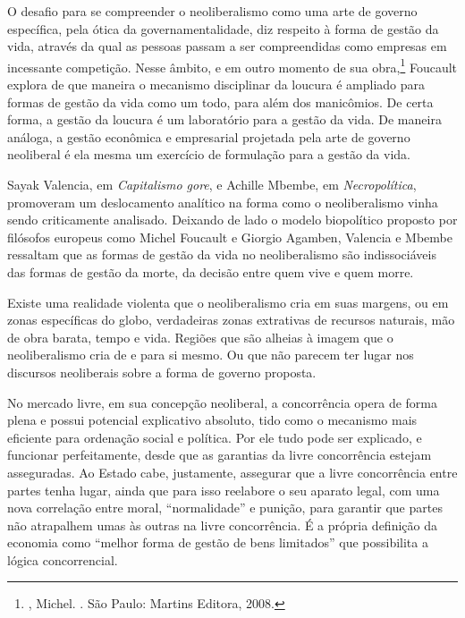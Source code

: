O desafio para se compreender o neoliberalismo como uma arte de governo
específica, pela ótica da governamentalidade, diz respeito à forma de
gestão da vida, através da qual as pessoas passam a ser compreendidas como empresas em
incessante competição. Nesse âmbito, e em outro momento de sua
obra,\footnote{, Michel. {}. São Paulo: Martins Editora, 2008.}
Foucault explora de que maneira o mecanismo disciplinar da loucura é
ampliado para formas de gestão da vida como um todo, para além dos manicômios. De certa forma, a gestão da
loucura é um laboratório para a gestão da vida. De maneira análoga, a gestão econômica e empresarial projetada pela
arte de governo neoliberal é ela mesma um exercício de formulação
para a gestão da vida.

Sayak Valencia, em \emph{Capitalismo gore}, e Achille Mbembe, em
\emph{Necropolítica}, promoveram um deslocamento analítico na forma como
o neoliberalismo vinha sendo criticamente analisado. Deixando de lado o
modelo biopolítico proposto por filósofos europeus como Michel Foucault
e Giorgio Agamben, Valencia e Mbembe ressaltam que as formas
de gestão da vida no neoliberalismo são indissociáveis das formas de
gestão da morte, da decisão entre quem vive e quem morre.

Existe uma realidade violenta que o neoliberalismo cria em suas margens,
ou em zonas específicas do globo, verdadeiras zonas extrativas de
recursos naturais, mão de obra barata, tempo e vida. Regiões que são
alheias à imagem que o neoliberalismo cria de e para si mesmo. Ou que não
parecem ter lugar nos discursos neoliberais sobre a forma de governo
proposta.

\asterisc

No mercado livre, em sua concepção neoliberal, a concorrência opera de
forma plena e possui potencial explicativo absoluto, tido como o
mecanismo mais eficiente para ordenação social e política. Por ele tudo
pode ser explicado, e funcionar perfeitamente, desde que as garantias da
livre concorrência estejam asseguradas. Ao Estado cabe, justamente,
assegurar que a livre concorrência entre partes tenha lugar, ainda que
para isso reelabore o seu aparato legal, com uma nova
correlação entre moral, ``normalidade'' e punição, para garantir que
partes não atrapalhem umas às outras na livre concorrência. É a própria
definição da economia como ``melhor forma de gestão de bens limitados''
que possibilita a lógica concorrencial.

